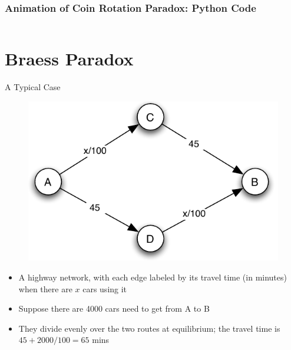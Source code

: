 \documentclass[10pt]{beamer}
\begin{document}
\begin{frame}[allowframebreaks]
  \frametitle{Animation of Coin Rotation Paradox: Python Code}
  \inputminted[linenos=true,breaklines,breakanywhere,bgcolor=bg]{python}{fig/note02/coin_rotation_paradox.py}
\end{frame}

\section{Braess Paradox}

\begin{frame}{A Typical Case}
  \begin{figure}
    \includegraphics[scale=.8,page=1]{fig/note02/braess.pdf}
  \end{figure}
  \onslide<+->
  \begin{itemize}[<+->]
    \item A highway network, with each edge labeled by its travel time (in minutes) when there are $x$ cars using it
    \item Suppose there are 4000 cars need to get from A to B 
    \item They divide evenly over the two routes at equilibrium; the travel time is $45 + 2000 / 100 = 65$ mins
  \end{itemize}
\end{frame}
\end{document}
